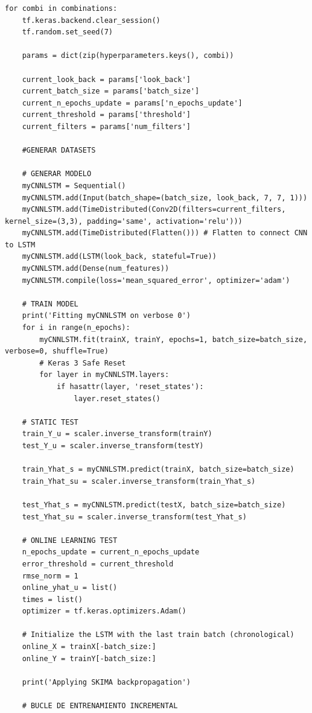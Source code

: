 \documentclass{article}
\begin{document}
\begin{lstlisting}[style=pythonstyle, caption={Bucle Grid Search}]
for combi in combinations:
    tf.keras.backend.clear_session()
    tf.random.set_seed(7)

    params = dict(zip(hyperparameters.keys(), combi))

    current_look_back = params['look_back']
    current_batch_size = params['batch_size']
    current_n_epochs_update = params['n_epochs_update']
    current_threshold = params['threshold']
    current_filters = params['num_filters']

    #GENERAR DATASETS

    # GENERAR MODELO
    myCNNLSTM = Sequential()
    myCNNLSTM.add(Input(batch_shape=(batch_size, look_back, 7, 7, 1)))
    myCNNLSTM.add(TimeDistributed(Conv2D(filters=current_filters, kernel_size=(3,3), padding='same', activation='relu')))
    myCNNLSTM.add(TimeDistributed(Flatten())) # Flatten to connect CNN to LSTM
    myCNNLSTM.add(LSTM(look_back, stateful=True))
    myCNNLSTM.add(Dense(num_features))
    myCNNLSTM.compile(loss='mean_squared_error', optimizer='adam')

    # TRAIN MODEL
    print('Fitting myCNNLSTM on verbose 0')
    for i in range(n_epochs):
        myCNNLSTM.fit(trainX, trainY, epochs=1, batch_size=batch_size, verbose=0, shuffle=True)
        # Keras 3 Safe Reset
        for layer in myCNNLSTM.layers:
            if hasattr(layer, 'reset_states'):
                layer.reset_states()

    # STATIC TEST
    train_Y_u = scaler.inverse_transform(trainY)
    test_Y_u = scaler.inverse_transform(testY)

    train_Yhat_s = myCNNLSTM.predict(trainX, batch_size=batch_size)
    train_Yhat_su = scaler.inverse_transform(train_Yhat_s)

    test_Yhat_s = myCNNLSTM.predict(testX, batch_size=batch_size)
    test_Yhat_su = scaler.inverse_transform(test_Yhat_s)

    # ONLINE LEARNING TEST
    n_epochs_update = current_n_epochs_update
    error_threshold = current_threshold
    rmse_norm = 1
    online_yhat_u = list()
    times = list()
    optimizer = tf.keras.optimizers.Adam()

    # Initialize the LSTM with the last train batch (chronological)
    online_X = trainX[-batch_size:]
    online_Y = trainY[-batch_size:]

    print('Applying SKIMA backpropagation')

    # BUCLE DE ENTRENAMIENTO INCREMENTAL


\end{lstlisting}
\end{document}
